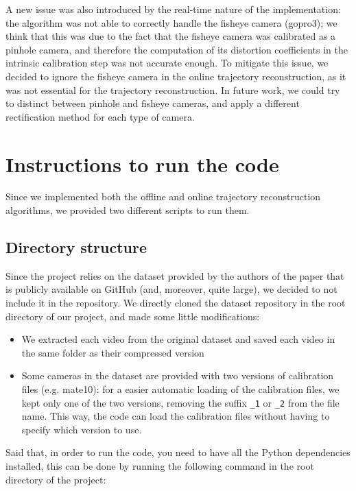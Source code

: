 \documentclass[11pt]{article}
\begin{document}
A new issue was also introduced by the real-time nature of the implementation: the algorithm was not able to correctly handle the fisheye camera (gopro3); we think that this was due to the fact that the fisheye camera was calibrated as a pinhole camera, and therefore the computation of its distortion coefficients in the intrinsic calibration step was not accurate enough. To mitigate this issue, we decided to ignore the fisheye camera in the online trajectory reconstruction, as it was not essential for the trajectory reconstruction. In future work, we could try to distinct between pinhole and fisheye cameras, and apply a different rectification method for each type of camera.

\section{Instructions to run the code}

Since we implemented both the offline and online trajectory reconstruction algorithms, we provided two different scripts to run them.

\subsection{Directory structure}

Since the project relies on the dataset provided by the authors of the paper that is publicly available on GitHub (and, moreover, quite large), we decided to not include it in the repository. We directly cloned the dataset repository in the root directory of our project, and made some little modifications:

\begin{itemize}
    \item We extracted each video from the original dataset and saved each video in the same folder as their compressed version
    \item Some cameras in the dataset are provided with two versions of calibration files (e.g. mate10): for a easier automatic loading of the calibration files, we kept only one of the two versions, removing the suffix \texttt{\_1} or \texttt{\_2} from the file name. This way, the code can load the calibration files without having to specify which version to use.
\end{itemize}

Said that, in order to run the code, you need to have all the Python dependencies installed, this can be done by running the following command in the root directory of the project:
\end{document}
